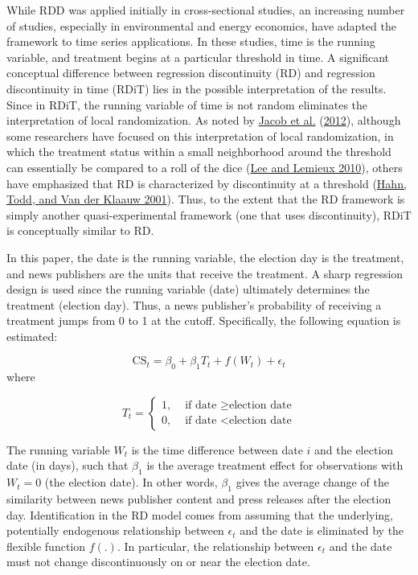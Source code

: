 \documentclass[
  12pt,
]{article}
\begin{document}
While RDD was applied initially in cross-sectional studies, an
increasing number of studies, especially in environmental and energy
economics, have adapted the framework to time series applications. In
these studies, time is the running variable, and treatment begins at a
particular threshold in time. A significant conceptual difference
between regression discontinuity (RD) and regression discontinuity in
time (RDiT) lies in the possible interpretation of the results. Since in
RDiT, the running variable of time is not random eliminates the
interpretation of local randomization. As noted by
\protect\hyperlink{ref-jacob_practical_2012}{Jacob et al.}
(\protect\hyperlink{ref-jacob_practical_2012}{2012}), although some
researchers have focused on this interpretation of local randomization,
in which the treatment status within a small neighborhood around the
threshold can essentially be compared to a roll of the dice
(\protect\hyperlink{ref-lee_regression_2010}{Lee and Lemieux 2010}),
others have emphasized that RD is characterized by discontinuity at a
threshold (\protect\hyperlink{ref-hahn_identification_2001}{Hahn, Todd,
and Van der Klaauw 2001}). Thus, to the extent that the RD framework is
simply another quasi-experimental framework (one that uses
discontinuity), RDiT is conceptually similar to RD.

In this paper, the date is the running variable, the election day is the
treatment, and news publishers are the units that receive the treatment.
A sharp regression design is used since the running variable (date)
ultimately determines the treatment (election day). Thus, a news
publisher's probability of receiving a treatment jumps from 0 to 1 at
the cutoff. Specifically, the following equation is estimated:

\[
\text{CS}_{t}=\beta_0+\beta_1T_t+f(W_t)+\epsilon_t
\] where

\[
T_t = 
\begin{cases}
1, & \text{ if date } \geq \text{election date} \\
0, & \text{ if date } < \text{election date}
\end{cases}
\]

The running variable \(W_t\) is the time difference between date \(i\)
and the election date (in days), such that \(\beta_1\) is the average
treatment effect for observations with \(W_t = 0\) (the election date).
In other words, \(\beta_1\) gives the average change of the similarity
between news publisher content and press releases after the election
day. Identification in the RD model comes from assuming that the
underlying, potentially endogenous relationship between \(\epsilon_t\)
and the date is eliminated by the flexible function \(f(.)\). In
particular, the relationship between \(\epsilon_t\) and the date must
not change discontinuously on or near the election date.
\end{document}
